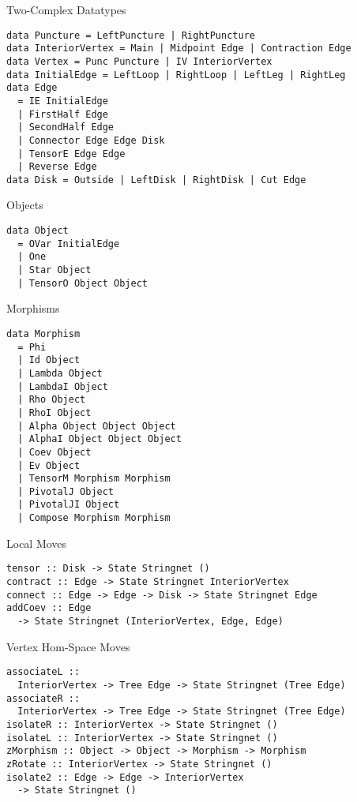 \documentclass{beamer}
\begin{document}
\begin{frame}[fragile]{Two-Complex Datatypes}
\begin{verbatim}
data Puncture = LeftPuncture | RightPuncture
data InteriorVertex = Main | Midpoint Edge | Contraction Edge
data Vertex = Punc Puncture | IV InteriorVertex
data InitialEdge = LeftLoop | RightLoop | LeftLeg | RightLeg
data Edge
  = IE InitialEdge
  | FirstHalf Edge
  | SecondHalf Edge
  | Connector Edge Edge Disk
  | TensorE Edge Edge
  | Reverse Edge
data Disk = Outside | LeftDisk | RightDisk | Cut Edge
\end{verbatim}
\end{frame}


\begin{frame}[fragile]{Objects}
\begin{verbatim}
data Object
  = OVar InitialEdge 
  | One 
  | Star Object 
  | TensorO Object Object
\end{verbatim}
\end{frame}

\begin{frame}[fragile]{Morphisms}
\begin{verbatim}
data Morphism
  = Phi
  | Id Object
  | Lambda Object
  | LambdaI Object
  | Rho Object
  | RhoI Object
  | Alpha Object Object Object
  | AlphaI Object Object Object
  | Coev Object
  | Ev Object
  | TensorM Morphism Morphism
  | PivotalJ Object
  | PivotalJI Object
  | Compose Morphism Morphism
\end{verbatim}
\end{frame}

\begin{frame}[fragile]{Local Moves}
\begin{verbatim}
tensor :: Disk -> State Stringnet ()
contract :: Edge -> State Stringnet InteriorVertex
connect :: Edge -> Edge -> Disk -> State Stringnet Edge
addCoev :: Edge 
  -> State Stringnet (InteriorVertex, Edge, Edge)
\end{verbatim}
\end{frame}

\begin{frame}[fragile]{Vertex Hom-Space Moves}
\begin{verbatim}
associateL ::
  InteriorVertex -> Tree Edge -> State Stringnet (Tree Edge)
associateR ::
  InteriorVertex -> Tree Edge -> State Stringnet (Tree Edge)
isolateR :: InteriorVertex -> State Stringnet ()
isolateL :: InteriorVertex -> State Stringnet ()
zMorphism :: Object -> Object -> Morphism -> Morphism
zRotate :: InteriorVertex -> State Stringnet ()
isolate2 :: Edge -> Edge -> InteriorVertex 
  -> State Stringnet ()
\end{verbatim}
\end{frame}
\end{document}
